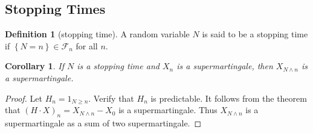 \documentclass{article}
\newtheorem{Cor}{Corollary}[Thm]
\theoremstyle{definition}
\newtheorem{Def}{Definition}[section]
\begin{document}
\subsection{Stopping Times}
\begin{Def}[stopping time]
    A random variable $N$ is said to be a stopping time if $\left\{N=n\right\}\in\mathcal{F}_n$ for all $n$.
\end{Def}
\begin{Cor}
    If $N$ is a stopping time and $X_n$ is a supermartingale, then $X_{N\wedge n}$ is a supermartingale.
\end{Cor}
\begin{proof}
    Let $H_n=1_{N\ge n}$. Verify that $H_n$ is predictable. It follows from the theorem that $(H\cdot X)_n=X_{N\wedge n}-X_0$ is a supermartingale. Thus $X_{N\wedge n}$ is a supermartingale as a sum of two supermartingale.
\end{proof}
\end{document}
